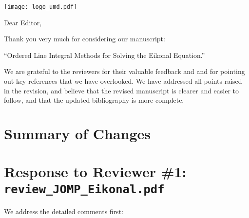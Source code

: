 \documentclass{article}
\begin{document}
\texttt{[image: logo\_umd.pdf]}

\vspace{5em}

Dear Editor,

Thank you very much for considering our manuscript:
\begin{center}
  ``Ordered Line Integral Methods for Solving the Eikonal Equation.''
\end{center}
We are grateful to the reviewers for their valuable feedback and and
for pointing out key references that we have overlooked.  We have
addressed all points raised in the revision, and believe that the
revised manuscript is clearer and easier to follow, and that the
updated bibliography is more complete.

\section*{Summary of Changes}

\section*{Response to Reviewer \#1: \texttt{review\_JOMP\_Eikonal.pdf}}

We address the detailed comments first:
\end{document}
